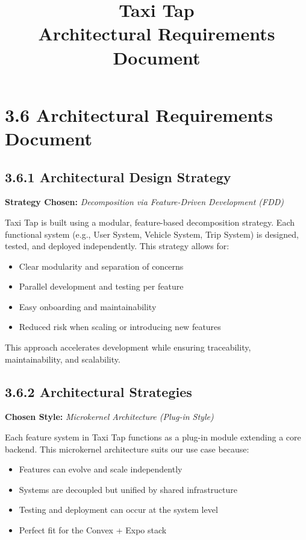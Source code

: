 \documentclass[12pt]{article}
\title{Taxi Tap\\Architectural Requirements Document}
\author{}
\date{}
\begin{document}
\maketitle

\section{3.6 Architectural Requirements Document}

\subsection{3.6.1 Architectural Design Strategy}
\textbf{Strategy Chosen:} \textit{Decomposition via Feature-Driven Development (FDD)}

Taxi Tap is built using a modular, feature-based decomposition strategy. Each functional system (e.g., User System, Vehicle System, Trip System) is designed, tested, and deployed independently. This strategy allows for:

\begin{itemize}
  \item Clear modularity and separation of concerns
  \item Parallel development and testing per feature
  \item Easy onboarding and maintainability
  \item Reduced risk when scaling or introducing new features
\end{itemize}

This approach accelerates development while ensuring traceability, maintainability, and scalability.

\subsection{3.6.2 Architectural Strategies}
\textbf{Chosen Style:} \textit{Microkernel Architecture (Plug-in Style)}

Each feature system in Taxi Tap functions as a plug-in module extending a core backend. This microkernel architecture suits our use case because:

\begin{itemize}
  \item Features can evolve and scale independently
  \item Systems are decoupled but unified by shared infrastructure
  \item Testing and deployment can occur at the system level
  \item Perfect fit for the Convex + Expo stack
\end{itemize}
\end{document}
